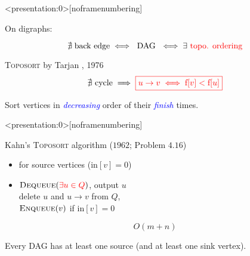 
\begin{frame}<presentation:0>[noframenumbering]
  \centerline{\large On digraphs:}
  \[
	\nexists\; \text{back edge} \iff \text{ DAG } \iff \exists \textcolor{red}{\text{ topo. ordering}}
  \]

  \pause
  \begin{block}{\textsc{Toposort} by Tarjan , 1976}
    \vspace{0.30cm}
    \[
      \nexists \text{ cycle} \implies \textcolor{red}{\boxed{u \to v \iff \text{f}[v] < \text{f}[u]}}
    \]

    \vspace{0.50cm}
    \centerline{Sort vertices in \textcolor{blue}{\emph{decreasing}} order of their \textcolor{blue}{\emph{finish}} times.}
  \end{block}
\end{frame}

\begin{frame}<presentation:0>[noframenumbering]
  \begin{exampleblock}{Kahn's \textsc{Toposort} algorithm ($1962$; Problem $4.16$) }
    \begin{itemize}
      \setlength{\itemsep}{5pt}
      \item {} for source vertices ($\text{in}[v] = 0$)
	  \item {} $\textsc{Dequeue}(\textcolor{red}{\exists u \in Q})$, output $u$ \\[6pt]
	\hspace{1.3cm} delete $u$ and $u \to v$ from $Q$, \\[5pt]
	\hspace{1.3cm} $\textsc{Enqueue}(v)$ if $\text{in}[v] = 0$
    \end{itemize}
  \end{exampleblock}

  \pause
  \[
    O(m + n)
  \]

  \pause
  \begin{lemma}
    Every DAG has at least one source (and at least one sink vertex).
  \end{lemma}

  \pause
  \vspace{0.50cm}
  \centerline{}
\end{frame}

